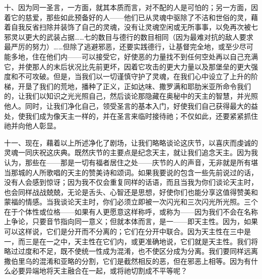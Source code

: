 十、因为同一圣言，一方面，就其本质而言，对不配的人是可怕的；另一方面，因着它的慈爱，那些如此预备好的人——他们已从灵魂中驱除了不洁和世俗的灵，藉着自我反省扫除并装饰了自己的灵魂，没有让灵魂空闲或无所事事，以免再次被七邪灵以更大的武装占据……七的数目与德行的数目相同（因为最难对抗的敌人要求最严厉的努力）……但除了逃避邪恶，还要实践德行，让基督完全地，或至少尽可能多地，住在他们内——可以接受它，好使恶的力量找不到任何空处再以自己充满它，并使那人的末后状况比先前更坏，因着它攻击的更大力量以及那堡垒的更大强度和不可攻破。但是，当我们以一切谨慎守护了灵魂，在我们心中设立了上升的阶梯，开垦了我们的荒地，播种了正义，正如达味、撒罗满和耶肋米亚所命令我们的，让我们以知识之光光照自己，然后谈论那隐藏在奥秘中的天主的智慧，并光照他人。同时，让我们净化自己，领受圣言的基本入门，好使我们自己获得最大的益处，使我们成为像天主一样的，并在圣言来临时接待祂；不仅如此，还要紧紧抓住祂并向他人彰显。\par

十一、现在，藉着以上所述净化了剧场，让我们略略谈论这庆节，以喜庆而虔诚的灵魂一同庆祝这庆典。既然庆节的主要点是纪念天主，就让我们追念天主。因为我认为，那些在——那是一切有福者居住之处——庆节的人的声音，无非就是所有堪当那城的人所歌唱的天主的赞美诗和颂词。如果我要说的包含一些先前说过的话，没有人会感到惊讶；因为我不仅会重复同样的话语，而且当我为你们谈论天主时，也会同样战战兢兢，无论是舌头、心智还是思想，好使你们也能分享这值得赞美和蒙福的情感。当我谈论天主时，你们必须立即被一次闪光和三次闪光所光照。三个在于个体性或位格——如果有人更愿意这样称呼，或称为——因为我们不会在名称上争论，只要音节指向同一意义；但就本体而言，是一——即天主性。因为，如果可以这样说，它们是分开而不分离的；它们在分开中联合。因为天主性在三中是一，而三是在一之中，天主性在它们内，或更准确地说，它们就是天主性。我们将略过过度和不足，既不使统一性成为混淆，也不使区分成为分离。我们要同样远离撒伯里乌的混淆和亚略的分割，它们是截然相反的恶，但在邪恶上相等。因为有什么必要异端地将天主融合在一起，或将祂切割成不平等呢？\par

